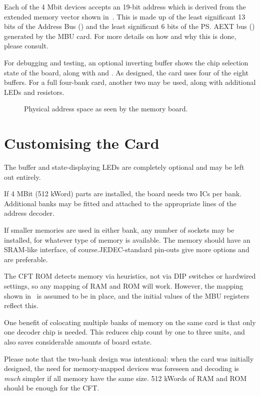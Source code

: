 Each of the 4 Mbit devices accepts an 19-bit address which is derived from the
extended memory vector shown in~. This is made up of the
least significant 13 bits of the Address Bus () and the least
significant 6 bits of the \ps{AEXT} bus () generated by the
\gls{MBU} card. For more details on how and why this is done, please
consult.

For debugging and testing, an optional inverting buffer shows the chip
selection state of the board, along with  and . As designed, the
card uses four of the eight buffers. For a full four-bank card, another two may
be used, along with additional LEDs and resistors.

\begin{figure}[tb]
  \centering
  \caption{\label{fig:mem-bits}Physical address space as seen by the memory board.}
\end{figure}


\section{Customising the Card}

The buffer and state-displaying LEDs are completely optional and may be left
out entirely.

If 4 MBit (512 kWord) parts are installed, the board needs two ICs per
bank. Additional banks may be fitted and attached to the appropriate lines of
the address decoder.

If smaller memories are used in either bank, any number of sockets may be
installed, for whatever type of memory is available. The memory should have an
SRAM-like interface, of course.JEDEC-standard pin-outs give more options and
are preferable.

The CFT ROM detects memory via heuristics, not via DIP switches or hardwired
settings, so any mapping of RAM and ROM will work. However, the mapping shown
in~ is assumed to be in place, and the initial values of
the \gls{MBU} registers reflect this.

One benefit of colocating multiple banks of memory on the same card is that
only one decoder chip is needed. This reduces chip count by one to three units,
and also saves considerable amounts of board estate.

Please note that the two-bank design was intentional: when the card was
initially designed, the need for memory-mapped devices was foreseen and
decoding is {\em much\/} simpler if all memory have the same size. 512 kWords
of RAM and ROM should be enough for the CFT.



